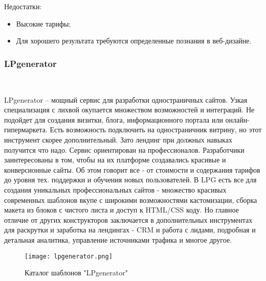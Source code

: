 Недостатки:

\begin{itemize}
	\item Высокие тарифы;
	\item Для хорошего результата требуются определенные познания в веб-дизайне.
\end{itemize}

\subsubsection{LPgenerator}
\

LPgenerator – мощный сервис для разработки одностраничных сайтов. Узкая специализация с лихвой окупается множеством возможностей и интеграций. Не подойдет для создания визитки, блога, информационного портала или онлайн-гипермаркета. Есть возможность подключить на одностраничник витрину, но этот инструмент скорее дополнительный. Зато лендинг при должных навыках получится что надо. 
Сервис ориентирован на профессионалов. Разработчики заинтересованы в том, чтобы на их платформе создавались красивые и конверсионные сайты. Об этом говорит все - от стоимости и содержания тарифов до уровня тех. поддержки и обучения новых пользователей. В LPG есть все для создания уникальных профессиональных сайтов - множество красивых современных шаблонов вкупе с широкими возможностями кастомизации, сборка макета из блоков с чистого листа и доступ к HTML/CSS коду. Но главное отличие от других конструкторов заключается в дополнительных инструментах для раскрутки и заработка на лендингах - CRM и работа с лидами, подробная и детальная аналитика, управление источниками трафика и многое другое.

\begin{figure}
\centering
	\texttt{[image: lpgenerator.png]}
	\caption{Каталог шаблонов "LPgenerator"}
	\label{sec:analysis:lpgenerator}
\end{figure}